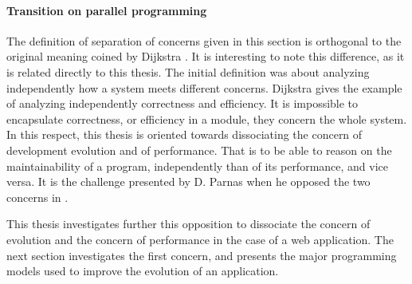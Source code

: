 \paragraph{Transition on parallel programming}

The definition of separation of concerns given in this section is orthogonal to the original meaning coined by Dijkstra \cite{Dijkstra1982}.
It is interesting to note this difference, as it is related directly to this thesis.
The initial definition was about analyzing independently how a system meets different concerns.
Dijkstra gives the example of analyzing independently correctness and efficiency.
It is impossible to encapsulate correctness, or efficiency in a module, they concern the whole system.
In this respect, this thesis is oriented towards dissociating the concern of development evolution and of performance.
That is to be able to reason on the maintainability of a program, independently than of its performance, and vice versa.
It is the challenge presented by D. Parnas when he opposed the two concerns in \cite{Parnas1972}.

This thesis investigates further this opposition to dissociate the concern of evolution and the concern of performance in the case of a web application.
The next section investigates the first concern, and presents the major programming models used to improve the evolution of an application.

\endinput



remote first Zack Holman : promote asynchronous communication
\ftnt{http://zachholman.com/posts/remote-first/}
+
Conway's law
\cit{Organizations which design systems [...] are constrained to produce designs which are copies of the communication structures of these organizations.}
{M. Conway \cite{Conway1968}}



\subsubsection{Modularity based on Design Decisions}

Designing Software for ease of extension and contraction \cite{Parnas1979}

Design Rules: The Power of Modularity Volume 1 \cite{Baldwin1999}
A reference book, but I can't get it.

Promises 
\cite{Liskov1988}


What makes a great software engineer? \cite{Li2015}

About great software development:
Productivity : Sackman et. al 68, Gugerty & Olson 86
Collaboration, meaningful contribution : Kelly 99, Begel & Simon 06, Hewner & Guzdial 10
Communicate and acquire understanding : LaToza 06, Ko 06
Technical Knowledge : 
Open minded : McConnell 04, Bryant 13